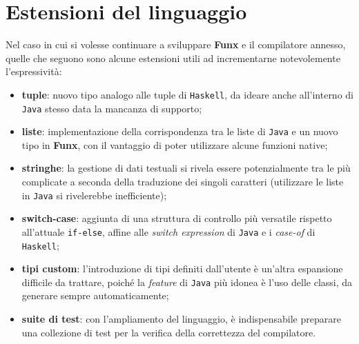 \section{Estensioni del linguaggio}
\label{sec:6-2-language-extensions}

Nel caso in cui si volesse continuare a sviluppare \textbf{Funx} e il compilatore annesso,
quelle che seguono sono alcune estensioni utili ad incrementarne notevolemente l'espressività:
\begin{itemize}
    \item \textbf{tuple}: nuovo tipo analogo alle tuple di \texttt{Haskell}, da ideare anche all'interno di \texttt{Java}
          stesso data la mancanza di supporto;
    \item \textbf{liste}: implementazione della corrispondenza tra le liste di \texttt{Java} e un nuovo tipo in \textbf{Funx},
          con il vantaggio di poter utilizzare alcune funzioni native;
    \item \textbf{stringhe}: la gestione di dati testuali si rivela essere potenzialmente tra le più complicate a seconda
          della traduzione dei singoli caratteri (utilizzare le liste in \texttt{Java} si rivelerebbe inefficiente);
    \item \textbf{switch-case}: aggiunta di una struttura di controllo più versatile rispetto all'attuale \texttt{if-else},
          affine alle \textit{switch expression} di \texttt{Java} e i \textit{case-of} di \texttt{Haskell};
    \item \textbf{tipi custom}: l'introduzione di tipi definiti dall'utente è un'altra espansione difficile da trattare,
          poiché la \textit{feature} di \texttt{Java} più idonea è l'uso delle classi, da generare sempre automaticamente;
    \item \textbf{suite di test}: con l'ampliamento del linguaggio, è indispensabile preparare una collezione di test
          per la verifica della correttezza del compilatore.
\end{itemize}